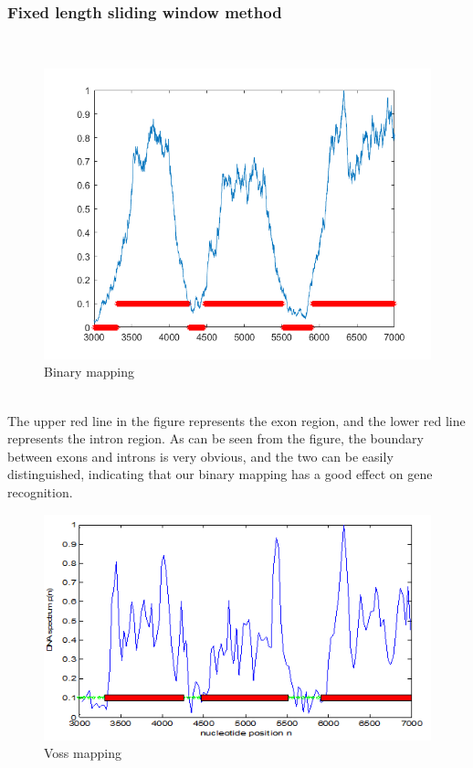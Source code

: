 \documentclass[conference]{IEEEtran}
\begin{document}
\subsubsection{Fixed length sliding window method}
~\\
\begin{figure}[H]
    \centering
    \includegraphics[width=\linewidth]{fixb.png}
    \caption{Binary mapping}
    \label{fixb}
\end{figure}
~\\\indent The upper red line in the figure represents the exon region, and the lower red line represents the intron region. As can be seen from the figure, the boundary between exons and introns is very obvious, and the two can be easily distinguished, indicating that our binary mapping has a good effect on gene recognition.
\begin{figure}[H]
    \centering
    \includegraphics[width=\linewidth, height=0.75\linewidth]{fixv.png}
    \caption{Voss mapping}
    \label{fixv}
\end{figure}
\end{document}
